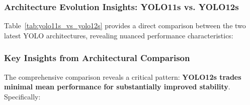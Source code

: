 \subsubsection{Architecture Evolution Insights: YOLO11s vs. YOLO12s}

Table~\ref{tab:yolo11s_vs_yolo12s} provides a direct comparison between the two latest YOLO architectures, revealing nuanced performance characteristics:

\begin{table}[htbp]
\centering
\caption{Direct Performance Comparison: YOLO11s vs. YOLO12s}
\label{tab:yolo11s_vs_yolo12s}
\end{table}

\subsubsection{Key Insights from Architectural Comparison}

The comprehensive comparison reveals a critical pattern: \textbf{YOLO12s trades minimal mean performance for substantially improved stability}. Specifically:


